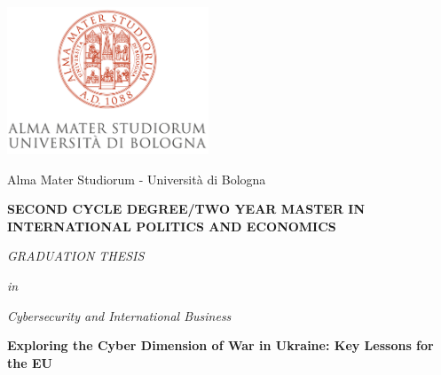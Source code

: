 \documentclass[12pt,a4paper]{report}
\newcommand{\ag}{\`a}
\begin{document}
\title{}
\author{Esterin Kojtari}
\date{8th February 2024}

\begin{titlepage}
        
        \Large

    \begin{center}
        \includegraphics[width=6cm]{logo.png} %
        \vspace*{0.2cm}
        
        {\fontsize{18pt}{20pt}\selectfont Alma Mater Studiorum - Universit{\ag} di Bologna\par}
    
        \noindent\hrulefill
        \vspace{0.4cm}
        
        \Large
        
        \textbf{SECOND CYCLE DEGREE/TWO YEAR
MASTER IN INTERNATIONAL POLITICS AND ECONOMICS}

        \vspace{0.8cm}


        \Large
        {\fontsize{21pt}{20}\textcolor{MyDarkBlue}{\textit{GRADUATION THESIS}}} \\
        \vspace{0.2cm}
    
        \textit{in}
        
        \vspace{0.2cm}
        {\fontsize{16pt}{16pt}\textit{Cybersecurity and International Business}}
        
        \Large
        \vspace{1cm}
        {\fontsize{21pt}{20}\textcolor{MyDarkBlue}{\textbf{Exploring the Cyber Dimension of War in Ukraine: Key Lessons for the EU}}}


\end{center}
\end{titlepage}
\end{document}
